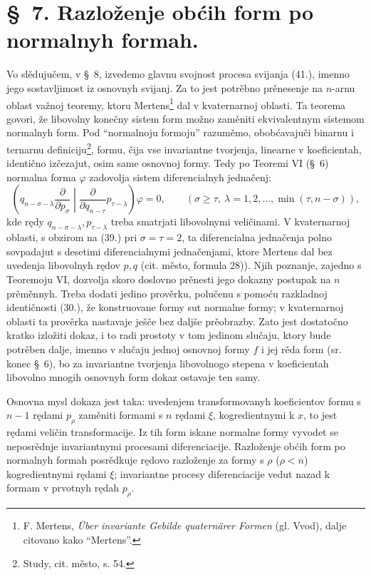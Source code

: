 \documentclass[11pt]{article}
\begin{document}
\section*{\S\ 7. Razloženje obćih form po normalnyh formah.}

Vo slědujučem, v \S\ 8, izvedemo glavnu svojnost procesa svijanja (41.), imenno jego sostavljimost iz osnovnyh svijanj. Za to jest potrěbno prěnesenje na $n$-arnu oblast važnoj teoremy, ktoru Mertens\footnote{F. Mertens, \emph{\"Uber invariante Gebilde quatern\"arer Formen} (gl. Vvod), dalje citovano kako ``Mertens''.} dal v kvaternarnoj oblasti. Ta teorema govori, že libovolny konečny sistem form možno zaměniti ekvivalentnym sistemom normalnyh form. Pod ``normalnoju formoju'' razuměmo, obobćavajuči binarnu i ternarnu definiciju\footnote{Study, cit. město, s. 54.}, formu, čija vse invariantne tvorjenja, linearne v koeficientah, identično izčezajut, osim same osnovnoj formy. Tedy po Teoremi VI (\S\ 6) normalna forma $\varphi$ zadovolja sistem diferencialnyh jednačenj:
\begin{equation}
 \left(q_{n-\sigma-\lambda}\frac{\partial}{\partial p_\sigma}\middle|\frac{\partial}{\partial q_{n-\tau}}p_{\tau-\lambda}\right)\varphi=0,
 \qquad(\sigma\ge\tau,\ \lambda=1,2,\ldots,\min(\tau,n-\sigma)),
\tag{46}
\end{equation}
kde rędy $q_{n-\sigma-\lambda},p_{\tau-\lambda}$ treba smatrjati libovolnymi veličinami. V kvaternarnoj oblasti, s obzirom na (39.) pri $\sigma=\tau=2$, ta diferencialna jednačenja polno sovpadajut s desetimi diferencialnymi jednačenjami, ktore Mertens dal bez uvedenja libovolnyh rędov $p,q$ (cit. město, formula 28)). Njih poznanje, zajedno s Teoremoju VI, dozvolja skoro doslovno prěnesti jego dokazny postupak na $n$ prěměnnyh. Treba dodati jedino prověrku, polučenu s pomoću razkladnoj identičnosti (30.), že konstruovane formy sut normalne formy; v kvaternarnoj oblasti ta prověrka nastavaje ješče bez daljše prěobrazby. Zato jest dostatočno kratko izložiti dokaz, i to radi prostoty v tom jedinom slučaju, ktory bude potrěben dalje, imenno v slučaju jednoj osnovnoj formy $f$ i jej rěda form (sr. konec \S\ 6), bo za invariantne tvorjenja libovolnogo stepena v koeficientah libovolno mnogih osnovnyh form dokaz ostavaje ten samy.

Osnovna mysl dokaza jest taka: uvedenjem transformovanyh koeficientov formu s $n-1$ rędami $p_\rho$ zaměniti formami s $n$ rędami $\xi$, kogredientnymi k $x$, to jest rędami veličin transformacije. Iz tih form iskane normalne formy vyvodet se neposrědnje invariantnymi procesami diferenciacije. Razloženje obćih form po normalnyh formah posrědkuje rędovo razloženje za formy s $\rho$ ($\rho<n$) kogredientnymi rędami $\xi$; invariantne procesy diferenciacije vedut nazad k formam v prvotnyh rędah $p_\rho$.
\end{document}
